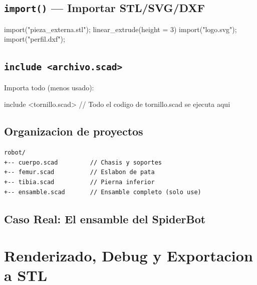 \documentclass[12pt, oneside, a4paper]{report}
\newcommand{\codigo}[1]{\texttt{#1}}
\begin{document}
\section{\codigo{import()} --- Importar STL/SVG/DXF}
\begin{openscad}
import("pieza_externa.stl");
linear_extrude(height = 3) import("logo.svg");
import("perfil.dxf");
\end{openscad}

\section{\codigo{include <archivo.scad>}} Importa todo (menos usado):
\begin{openscad}
include <tornillo.scad>
// Todo el codigo de tornillo.scad se ejecuta aqui
\end{openscad}

\section{Organizacion de proyectos}
{\small
\begin{verbatim}
robot/
+-- cuerpo.scad         // Chasis y soportes
+-- femur.scad          // Eslabon de pata
+-- tibia.scad          // Pierna inferior
+-- ensamble.scad       // Ensamble completo (solo use)
\end{verbatim}
}

\section{Caso Real: El ensamble del SpiderBot}

\chapter{Renderizado, Debug y Exportacion a STL}
\end{document}
